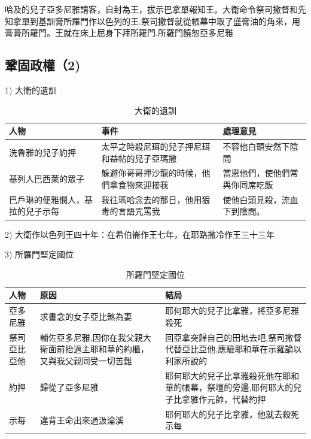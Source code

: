 \documentclass{ctexart}
\begin{document}
哈及的兒子亞多尼雅請客，自封為王，拔示巴拿單報知王。大衛命令祭司撒督和先知拿單到基訓膏所羅門作以色列的王.祭司撒督就從帳幕中取了盛膏油的角來，用膏膏所羅門。王就在床上屈身下拜所羅門.所羅門饒恕亞多尼雅

\subsection{鞏固政權（2)}

\begin{description}  
\item   1) 大衛的遺訓 
\begin{table}[!hbp]
\centering
\begin{tabular}{|p{4cm}|p{5cm}|p{5cm}|}
\hline
\hline
  人物   & 事件 &處理意見 \\\hline\hline
洗魯雅的兒子約押    & 太平之時殺尼珥的兒子押尼珥和益帖的兒子亞瑪撒 & 不容他白頭安然下陰間 \\\hline
基列人巴西萊的眾子     & 躲避你哥哥押沙龍的時候，他們拿食物來迎接我&當恩他們，使他們常與你同席吃飯 \\\hline
巴戶琳的便雅憫人，基拉的兒子示每    & 我往瑪哈念去的那日，他用狠毒的言語咒罵我&使他白頭見殺，流血下到陰間。  \\\hline
\end{tabular}
\caption{大衛的遺訓}
\end{table}
\item   2) 大衛作以色列王四十年：在希伯崙作王七年，在耶路撒冷作王三十三年 
\item   3) 所羅門堅定國位 
\begin{table}[!hbp]
\centering
\begin{tabular}{|p{1.5cm}|p{5cm}|p{8.5cm}|}
\hline
\hline
  人物   &原因 & 結局  \\\hline\hline
亞多尼雅 & 求書念的女子亞比煞為妻 & 耶何耶大的兒子比拿雅，將亞多尼雅殺死 \\\hline
祭司亞比亞他     & 輔佐亞多尼雅,因你在我父親大衛面前抬過主耶和華的約櫃，又與我父親同受一切苦難&回亞拿突歸自己的田地去吧,祭司撒督代替亞比亞他,應驗耶和華在示羅論以利家所說的\\\hline
約押    & 歸從了亞多尼雅&耶何耶大的兒子比拿雅殺死他在耶和華的帳幕，祭壇的旁邊,耶何耶大的兒子比拿雅作元帥，代替約押 \\\hline
示每&違背王命出來過汲淪溪&耶何耶大的兒子比拿雅，他就去殺死示每\\\hline
\end{tabular}
\caption{所羅門堅定國位}
\end{table}
\end{description}
\end{document}
